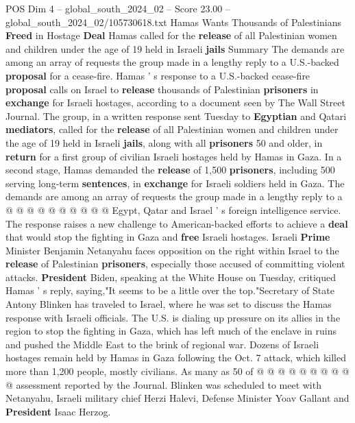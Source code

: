 \begin{textsample}{POS Dim 4 – global\_south\_2024\_02 – Score 23.00 – global\_south\_2024\_02/105730618.txt}  \label{ex:f4_pos_074}
Hamas Wants Thousands of Palestinians \textbf{Freed} in Hostage \textbf{Deal} Hamas called for the \textbf{release} of all Palestinian women and children under the age of 19 held in Israeli \textbf{jails} Summary The demands are among an array of requests the group made in a lengthy reply to a U.S.-backed \textbf{proposal} for a cease-fire.
Hamas ' s response to a U.S.-backed cease-fire \textbf{proposal} calls on Israel to \textbf{release} thousands of Palestinian \textbf{prisoners} in \textbf{exchange} for Israeli hostages, according to a document seen by The Wall Street Journal.
The group, in a written response sent Tuesday to \textbf{Egyptian} and Qatari \textbf{mediators}, called for the \textbf{release} of all Palestinian women and children under the age of 19 held in Israeli \textbf{jails}, along with all \textbf{prisoners} 50 and older, in \textbf{return} for a first group of civilian Israeli hostages held by Hamas in Gaza.
In a second stage, Hamas demanded the \textbf{release} of 1,500 \textbf{prisoners}, including 500 serving long-term \textbf{sentences}, in \textbf{exchange} for Israeli soldiers held in Gaza.
The demands are among an array of requests the group made in a lengthy reply to a @ @ @ @ @ @ @ @ @ @ Egypt, Qatar and Israel ' s foreign intelligence service.
The response raises a new challenge to American-backed efforts to achieve a \textbf{deal} that would stop the fighting in Gaza and \textbf{free} Israeli hostages.
Israeli \textbf{Prime} Minister Benjamin Netanyahu faces opposition on the right within Israel to the \textbf{release} of Palestinian \textbf{prisoners}, especially those accused of committing violent attacks. \textbf{President} Biden, speaking at the White House on Tuesday, critiqued Hamas ' s reply, saying,"It seems to be a little over the top."Secretary of State Antony Blinken has traveled to Israel, where he was set to discuss the Hamas response with Israeli officials.
The U.S. is dialing up pressure on its allies in the region to stop the fighting in Gaza, which has left much of the enclave in ruins and pushed the Middle East to the brink of regional war.
Dozens of Israeli hostages remain held by Hamas in Gaza following the Oct. 7 attack, which killed more than 1,200 people, mostly civilians.
As many as 50 of @ @ @ @ @ @ @ @ @ @ assessment reported by the Journal.
Blinken was scheduled to meet with Netanyahu, Israeli military chief Herzi Halevi, Defense Minister Yoav Gallant and \textbf{President} Isaac Herzog.

\end{textsample}

